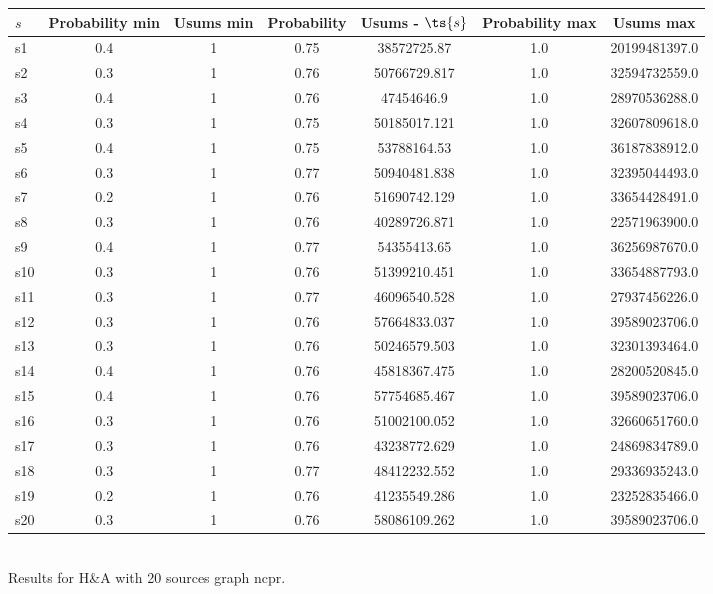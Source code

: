 \documentclass{article}
\begin{document}
\noindent\begin{tabular}{|l|c|c|c|c|c|c|}
\hline
$s$& Probability min & Usums min & Probability & Usums - $\ts{s}$ & Probability max & Usums max\\
\hline
s1 &0.4 & 1 & 0.75 & 38572725.87 & 1.0 & 20199481397.0\\
\hline
s2 &0.3 & 1 & 0.76 & 50766729.817 & 1.0 & 32594732559.0\\
\hline
s3 &0.4 & 1 & 0.76 & 47454646.9 & 1.0 & 28970536288.0\\
\hline
s4 &0.3 & 1 & 0.75 & 50185017.121 & 1.0 & 32607809618.0\\
\hline
s5 &0.4 & 1 & 0.75 & 53788164.53 & 1.0 & 36187838912.0\\
\hline
s6 &0.3 & 1 & 0.77 & 50940481.838 & 1.0 & 32395044493.0\\
\hline
s7 &0.2 & 1 & 0.76 & 51690742.129 & 1.0 & 33654428491.0\\
\hline
s8 &0.3 & 1 & 0.76 & 40289726.871 & 1.0 & 22571963900.0\\
\hline
s9 &0.4 & 1 & 0.77 & 54355413.65 & 1.0 & 36256987670.0\\
\hline
s10 &0.3 & 1 & 0.76 & 51399210.451 & 1.0 & 33654887793.0\\
\hline
s11 &0.3 & 1 & 0.77 & 46096540.528 & 1.0 & 27937456226.0\\
\hline
s12 &0.3 & 1 & 0.76 & 57664833.037 & 1.0 & 39589023706.0\\
\hline
s13 &0.3 & 1 & 0.76 & 50246579.503 & 1.0 & 32301393464.0\\
\hline
s14 &0.4 & 1 & 0.76 & 45818367.475 & 1.0 & 28200520845.0\\
\hline
s15 &0.4 & 1 & 0.76 & 57754685.467 & 1.0 & 39589023706.0\\
\hline
s16 &0.3 & 1 & 0.76 & 51002100.052 & 1.0 & 32660651760.0\\
\hline
s17 &0.3 & 1 & 0.76 & 43238772.629 & 1.0 & 24869834789.0\\
\hline
s18 &0.3 & 1 & 0.77 & 48412232.552 & 1.0 & 29336935243.0\\
\hline
s19 &0.2 & 1 & 0.76 & 41235549.286 & 1.0 & 23252835466.0\\
\hline
s20 &0.3 & 1 & 0.76 & 58086109.262 & 1.0 & 39589023706.0\\
\hline
\end{tabular}\\

\noindent Results for H\&A with 20 sources graph ncpr.
\end{document}
